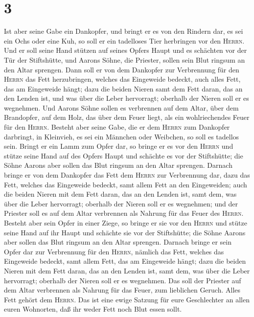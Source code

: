 \hypertarget{section-2}{%
\section{3}\label{section-2}}

 Ist aber seine Gabe ein Dankopfer, und bringt er es von
den Rindern dar, es sei ein Ochs oder eine Kuh, so soll er ein
tadelloses Tier herbringen vor den \textsc{Herrn}.  Und er
soll seine Hand stützen auf seines Opfers Haupt und es schächten vor der
Tür der Stiftshütte, und Aarons Söhne, die Priester, sollen sein Blut
ringsum an den Altar sprengen.  Dann soll er von dem
Dankopfer zur Verbrennung für den \textsc{Herrn} das Fett herzubringen,
welches das Eingeweide bedeckt, auch alles Fett, das am Eingeweide
hängt;  dazu die beiden Nieren samt dem Fett daran, das an
den Lenden ist, und was über die Leber hervorragt; oberhalb der Nieren
soll er es wegnehmen.  Und Aarons Söhne sollen es
verbrennen auf dem Altar, über dem Brandopfer, auf dem Holz, das über
dem Feuer liegt, als ein wohlriechendes Feuer für den \textsc{Herrn}.
 Besteht aber seine Gabe, die er dem \textsc{Herrn} zum
Dankopfer darbringt, in Kleinvieh, es sei ein Männchen oder Weibchen, so
soll es tadellos sein.  Bringt er ein Lamm zum Opfer dar,
so bringe er es vor den \textsc{Herrn}  und stütze seine
Hand auf des Opfers Haupt und schächte es vor der Stiftshütte; die Söhne
Aarons aber sollen das Blut ringsum an den Altar sprengen.
 Darnach bringe er von dem Dankopfer das Fett dem
\textsc{Herrn} zur Verbrennung dar, dazu das Fett, welches das
Eingeweide bedeckt, samt allem Fett an den Eingeweiden; 
auch die beiden Nieren mit dem Fett daran, das an den Lenden ist, samt
dem, was über die Leber hervorragt; oberhalb der Nieren soll er es
wegnehmen;  und der Priester soll es auf dem Altar
verbrennen als Nahrung für das Feuer des \textsc{Herrn}. 
Besteht aber sein Opfer in einer Ziege, so bringe er sie vor den
\textsc{Herrn}  und stütze seine Hand auf ihr Haupt und
schächte sie vor der Stiftshütte; die Söhne Aarons aber sollen das Blut
ringsum an den Altar sprengen.  Darnach bringe er sein
Opfer dar zur Verbrennung für den \textsc{Herrn}, nämlich das Fett,
welches das Eingeweide bedeckt, samt allem Fett, das am Eingeweide
hängt;  dazu die beiden Nieren mit dem Fett daran, das an
den Lenden ist, samt dem, was über die Leber hervorragt; oberhalb der
Nieren soll er es wegnehmen.  Das soll der Priester auf
dem Altar verbrennen als Nahrung für das Feuer, zum lieblichen Geruch.
Alles Fett gehört dem \textsc{Herrn}.  Das ist eine ewige
Satzung für eure Geschlechter an allen euren Wohnorten, daß ihr weder
Fett noch Blut essen sollt.

